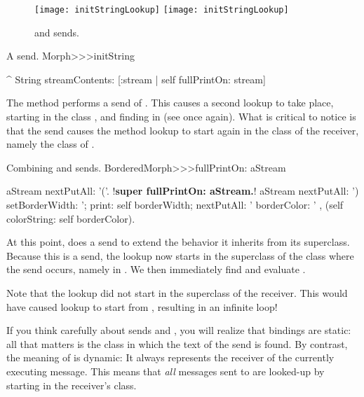 \documentclass[a4paper,10pt,twoside]{book}
\begin{document}
\begin{figure}[htb]
\begin{center}
\ifluluelse
	{\texttt{[image: initStringLookup]}}
	{\texttt{[image: initStringLookup]}}
\caption{\self and \super sends\label{fig:initStringLookup}.}
\end{center}
\end{figure}

\begin{method}[initString]{A \self send.}
Morph>>>initString

	^ String streamContents: [:stream | self fullPrintOn: stream]
\end{method}
The method  performs a \self send of .
This causes a second lookup to take place, starting in the class , and finding  in  (see  once again).
What is critical to notice is that the \self send causes the method lookup to start again in the class of the receiver, namely the class of .


\begin{method}[fullPrintOn]{Combining \super and \self sends.}
BorderedMorph>>>fullPrintOn: aStream

	aStream nextPutAll: '('.
	!\textbf{super fullPrintOn: aStream.}!
	aStream
		nextPutAll: ') setBorderWidth: ';
		print: self borderWidth;
		nextPutAll: ' borderColor: ' , (self colorString: self borderColor).
\end{method}
At this point,  does a \super send to extend the
 behavior it inherits from its superclass.
Because this is a \super send, the lookup now starts in the superclass of the class where the \super send occurs, namely in .
We then immediately find and evaluate .

Note that the \super lookup did not start in the superclass of the receiver.
This would have caused lookup to start from , resulting in an infinite loop!


If you think carefully about \super sends and , you will realize that \super bindings are static: all that matters is the class in which the text of the \super send is found.
By contrast, the meaning of \self is dynamic:
It always represents the receiver of the currently executing message.
This means that \emph{all} messages sent to \self are looked-up by starting in the receiver's class.
\end{document}
